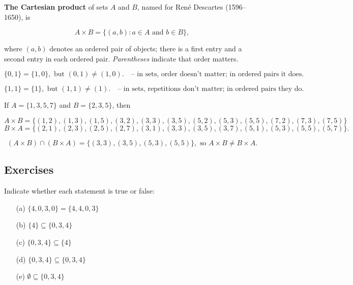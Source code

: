 \documentclass[
	12pt, %
	fleqn, %
	a4paper, %
]{LegrandOrangeBook}
\begin{document}
\begin{definition}
    \textbf{The Cartesian product} of sets \( A \) and \( B \), named for Ren\'e Descartes (1596--1650), is

\[ A \times B = \{(a, b): a \in A \text{ and } b \in B\}, \]

where \( (a,b) \) denotes an ordered pair of objects; there is a first entry and a second entry in each ordered pair. \emph{Parentheses} indicate that order matters.

\end{definition}
\begin{remark}
    \[ \{0, 1\} = \{1, 0\}, \text{ but } (0, 1) \neq (1, 0). \quad \text{-- in sets, order doesn't matter; in ordered pairs it does.} \]
    
\[ \{1, 1\} = \{1\}, \text{ but } (1, 1) \neq (1). \quad \text{-- in sets, repetitions don't matter; in ordered pairs they do.} \]

\end{remark}
\begin{example}
    If \( A = \{1,3,5,7\} \) and \( B = \{2,3,5\} \), then

\[ A \times B = \{(1, 2), (1, 3), (1, 5), (3, 2), (3, 3), (3, 5), (5, 2), (5, 3), (5, 5), (7, 2), (7, 3), (7, 5)\} \]
\[ B \times A = \{(2, 1), (2, 3), (2, 5), (2, 7), (3, 1), (3, 3), (3, 5), (3, 7), (5, 1), (5, 3), (5, 5), (5, 7)\}. \]

\[ (A \times B) \cap (B \times A) = \{(3,3), (3,5), (5,3), (5,5)\}, \text{ so } A \times B \neq B \times A. \]
\end{example}

\subsection{Exercises}
\begin{exercise}
Indicate whether each statement is true or false:
\begin{enumerate}
    \item[(a)] \(\{4, 0, 3, 0\} = \{4, 4, 0, 3\}\)
    \item[(b)] \(\{4\} \subseteq \{0, 3, 4\}\)
    \item[(c)] \(\{0, 3, 4\} \subseteq \{4\}\)
    \item[(d)] \(\{0, 3, 4\} \subseteq \{0, 3, 4\}\)
    \item[(e)] \(\emptyset \subseteq \{0, 3, 4\}\)
\end{enumerate}

\end{exercise}
\end{document}
